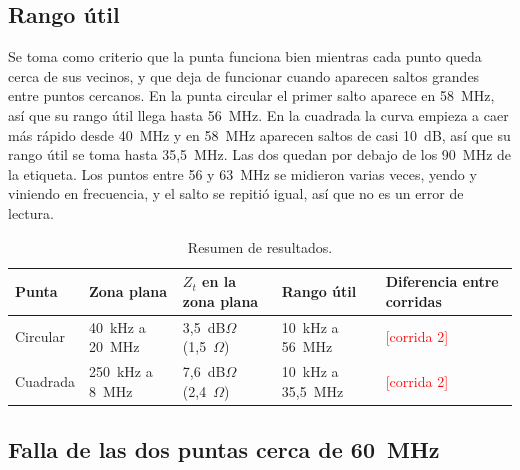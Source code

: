 \documentclass[11pt,a4paper]{article}
\newcommand{\pendiente}[1]{\textcolor{red}{[#1]}}
\begin{document}
\subsection{Rango útil}

Se toma como criterio que la punta funciona bien mientras cada punto queda cerca de sus vecinos, y que deja de funcionar cuando aparecen saltos grandes entre puntos cercanos. En la punta circular el primer salto aparece en 58~MHz, así que su rango útil llega hasta 56~MHz. En la cuadrada la curva empieza a caer más rápido desde 40~MHz y en 58~MHz aparecen saltos de casi 10~dB, así que su rango útil se toma hasta 35,5~MHz. Las dos quedan por debajo de los 90~MHz de la etiqueta. Los puntos entre 56 y 63~MHz se midieron varias veces, yendo y viniendo en frecuencia, y el salto se repitió igual, así que no es un error de lectura.

\begin{table}[H]
  \centering
  \begin{tabular}{@{}lllll@{}}
    \toprule
    Punta & Zona plana & $Z_t$ en la zona plana & Rango útil & Diferencia entre corridas \\
    \midrule
    Circular & 40~kHz a 20~MHz & 3,5~dB$\Omega$ (1,5~$\Omega$) & 10~kHz a 56~MHz & \pendiente{corrida 2} \\
    Cuadrada & 250~kHz a 8~MHz & 7,6~dB$\Omega$ (2,4~$\Omega$) & 10~kHz a 35,5~MHz & \pendiente{corrida 2} \\
    \bottomrule
  \end{tabular}
  \caption{Resumen de resultados.}
  \label{tab:resumen}
\end{table}

\subsection{Falla de las dos puntas cerca de 60~MHz}
\end{document}
